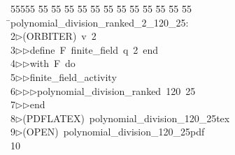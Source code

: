 %
%
\begin{tabbing}
55555 \= 55 \= 55 \= 55 \= 55 \= 55 \= 55 \= 55 \= 55 \= 55 \= 55 \= 55 \= 55 \= \>polynomial\_division\_ranked\_2\_120\_25:\\[0pt]
2\>$\triangleright$\>(ORBITER)\ v\ 2\ \\[0pt]
3\>$\triangleright$\>$\triangleright$\>define\ F\ finite\_field\ q\ 2\ end\ \\[0pt]
4\>$\triangleright$\>$\triangleright$\>with\ F\ do\ \\[0pt]
5\>$\triangleright$\>$\triangleright$\>finite\_field\_activity\ \\[0pt]
6\>$\triangleright$\>$\triangleright$\>$\triangleright$\>polynomial\_division\_ranked\ 120\ 25\ \\[0pt]
7\>$\triangleright$\>$\triangleright$\>end\\[0pt]
8\>$\triangleright$\>(PDFLATEX)\ polynomial\_division\_120\_25tex\\[0pt]
9\>$\triangleright$\>(OPEN)\ polynomial\_division\_120\_25pdf\\[0pt]
10\>\end{tabbing}
